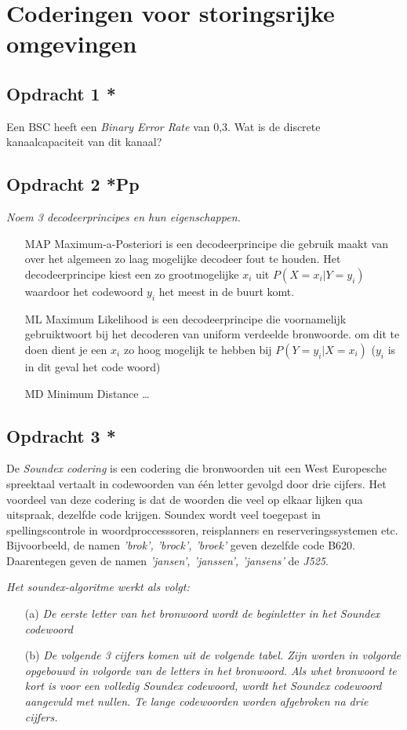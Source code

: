 \chapter{Coderingen voor storingsrijke omgevingen}

\section{Opdracht 1 *}
Een BSC heeft een \emph{Binary Error Rate} van 0,3. Wat is de discrete kanaalcapaciteit van dit kanaal?

\section{Opdracht 2 *Pp}
\emph{Noem 3 decodeerprincipes en hun eigenschappen.}\\

\begin{itemize}
  \item[MAP] Maximum-a-Posteriori is een decodeerprincipe die gebruik maakt van over het algemeen zo laag mogelijke decodeer fout te houden. Het decodeerprincipe kiest een zo grootmogelijke $x_i$ uit $P(X=x_i|Y=y_i)$ waardoor het codewoord $y_i$ het meest in de buurt komt.
  \item[ML] Maximum Likelihood is een decodeerprincipe die voornamelijk gebruiktwoort bij het decoderen van uniform verdeelde bronwoorde. om dit te doen dient je een $x_i$ zo hoog mogelijk te hebben bij $P(Y=y_i|X=x_i)$ ($y_i$ is in dit geval het code woord)
  \item[MD] Minimum Distance \ldots
\end{itemize}

\section{Opdracht 3 *}
De \emph{Soundex codering} is een codering die bronwoorden uit een West Europesche spreektaal vertaalt in codewoorden van \'{e}\'{e}n letter gevolgd door drie cijfers. Het voordeel van deze codering is dat de woorden die veel op elkaar lijken qua uitspraak, dezelfde code krijgen. Soundex wordt veel toegepast in spellingscontrole in woordproccesssoren, reisplanners en reserveringssystemen etc. Bijvoorbeeld, de namen \emph{'brok', 'brock', 'broek'} geven dezelfde code B620. Daarentegen geven de namen \emph{'jansen', 'janssen', 'jansens'} de \emph{J525}.

\emph{Het soundex-algoritme werkt als volgt:}
\begin{itemize}
  \item[(a)]\emph{De eerste letter van het bronwoord wordt de beginletter in het Soundex codewoord}
  \item[(b)]\emph{De volgende 3 cijfers komen uit de volgende tabel. Zijn worden in volgorde opgebouwd in volgorde van de letters in het bronwoord. Als whet bronwoord te kort is voor een volledig Soundex codewoord, wordt het Soundex codewoord aangevuld met nullen. Te lange codewoorden worden afgebroken na drie cijfers.}
\end{itemize}

